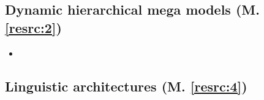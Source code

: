 
\subsection{Dynamic hierarchical mega models (M. \ref{resrc:2})}
\begin{itemize}

\item 

\end{itemize}


\subsection{Linguistic architectures (M. \ref{resrc:4})}
